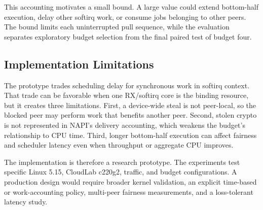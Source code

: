 This accounting motivates a small bound.  A large value could extend
bottom-half execution, delay other softirq work, or consume jobs belonging to
other peers.  The bound limits each uninterrupted pull sequence, while the
evaluation separates exploratory budget selection from the final paired test
of budget four.

\subsection{Implementation Limitations}
\label{sec:design-limitations}

The prototype trades scheduling delay for synchronous work in softirq context.
That trade can be favorable when one RX/softirq core is the binding resource,
but it creates three limitations.  First, a device-wide steal is not
peer-local, so the blocked peer may perform work that benefits another peer.
Second, stolen crypto is not represented in NAPI's delivery accounting, which
weakens the budget's relationship to CPU time.  Third, longer bottom-half
execution can affect fairness and scheduler latency even when throughput or
aggregate CPU improves.

The implementation is therefore a research prototype.  The experiments test
specific Linux 5.15, CloudLab c220g2, traffic, and budget configurations.  A
production design would require broader kernel validation, an explicit
time-based or work-accounting policy, multi-peer fairness measurements, and a
loss-tolerant latency study.
\par\endgroup
